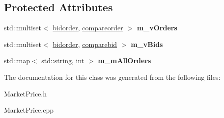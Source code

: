 \subsection*{Protected Attributes}
\begin{DoxyCompactItemize}
\item 
std\+::multiset$<$ \hyperlink{structbidorder}{bidorder}, \hyperlink{structcompareorder}{compareorder} $>$ {\bfseries m\+\_\+v\+Orders}\hypertarget{classOrderBook_a358e442ed8f1a624980ad94d92da0b60}{}\label{classOrderBook_a358e442ed8f1a624980ad94d92da0b60}

\item 
std\+::multiset$<$ \hyperlink{structbidorder}{bidorder}, \hyperlink{structcomparebid}{comparebid} $>$ {\bfseries m\+\_\+v\+Bids}\hypertarget{classOrderBook_ac92dd0de80ccf38ae1886722b42d88cc}{}\label{classOrderBook_ac92dd0de80ccf38ae1886722b42d88cc}

\item 
std\+::map$<$ std\+::string, int $>$ {\bfseries m\+\_\+m\+All\+Orders}\hypertarget{classOrderBook_a8b4360d22e9208f5d2ce6195495044ad}{}\label{classOrderBook_a8b4360d22e9208f5d2ce6195495044ad}

\end{DoxyCompactItemize}


The documentation for this class was generated from the following files\+:\begin{DoxyCompactItemize}
\item 
Market\+Price.\+h\item 
Market\+Price.\+cpp\end{DoxyCompactItemize}
